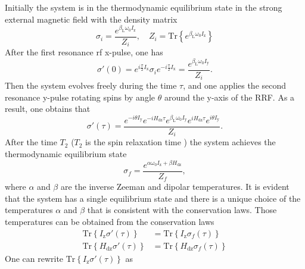 Initially the system is in the thermodynamic equilibrium state in the strong external magnetic field with the density matrix
%
\begin{equation}
    \label{eq:a1}
   \sigma_{i} = \dfrac{e^{\beta_\mathrm{L} \omega_{0} I_\mathrm{z}}}{Z_{i}} ,
   \quad
   Z_{i} = \mathrm{Tr}\left\{e^{\beta_\mathrm{L} \omega_{0} I_\mathrm{z}} \right\}
\end{equation}
%
After the first resonance rf x-pulse, one has
%
\begin{equation}
    \label{eq:a2}
    \sigma'(0) = e^{ i \frac \pi 2 I_\mathrm{x}}
    \sigma_{i}
    e^{-i \frac \pi 2 I_\mathrm{x}}
    = \dfrac{e^{\beta_\mathrm{L} \omega_{0} I_\mathrm{y}}}{Z_{i}}  .
\end{equation}
%
Then the system evolves freely during the time $\tau$,
and one applies the second resonance y-pulse rotating spins by angle $\theta$ around the y-axis of the RRF.
As a result, one obtains that
\begin{equation}
    \label{eq:a3}
    \sigma'(\tau)
    = \dfrac{
      e^{-i \theta I_\mathrm{y}} e^{-i H_\mathrm{dz} \tau}
      e^{\beta_\mathrm{L} \omega_{0} I_\mathrm{y}}
      e^{i H_\mathrm{dz} \tau} e^{i \theta I_\mathrm{y}}
    }{Z_{i}}.
\end{equation}
%
After the time $T_2$ ($T_2$ is the spin relaxation time \cite{Goldman_1970}) the system achieves the thermodynamic equilibrium state
\begin{equation}
    \label{eq:a4}
    \sigma_{f}
    = \dfrac{ e^{\alpha \omega_{0} I_\mathrm{z} + \beta H_\mathrm{dz}} }{Z_f},
\end{equation}
%
where $\alpha$ and $\beta$ are the inverse Zeeman and dipolar temperatures.
It is evident that the system has a single equilibrium state
and there is a unique choice of the temperatures $\alpha$ and $\beta$
that is consistent with the conservation laws.
Those temperatures can be obtained from the conservation laws
\begin{align}
    \label{eq:a5}
    \mathrm{Tr} \left\{ I_\mathrm{z} \sigma'(\tau) \right\}
    & = \mathrm{Tr} \left\{ I_\mathrm{z} \sigma_{f}(\tau) \right\}
    \\
    \label{eq:a6}
    \mathrm{Tr} \left\{ H_\mathrm{dz} \sigma'(\tau) \right\}
    & = \mathrm{Tr} \left\{ H_\mathrm{dz} \sigma_{f}(\tau) \right\}
\end{align}
%
One can rewrite $\mathrm{Tr} \left\{ I_\mathrm{z} \sigma'(\tau) \right\}$ as
%
